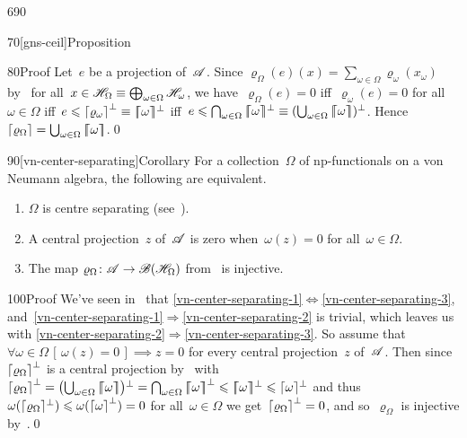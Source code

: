 \begin{parsec}{690}
\begin{point}{70}[gns-ceil]{Proposition}
\begin{point}{80}{Proof}
Let~$e$ be a projection of~$\mathscr{A}$.
Since
$\varrho_\Omega(e)(x)
= \sum_{\omega\in\Omega} \varrho_\omega(x_\omega)$
by~
for all~$x\in\mathscr{H}_\Omega\equiv\bigoplus_{\omega\in\Omega}\mathscr{H}_\omega$,
we have~$\varrho_\Omega(e)=0$
iff~$\varrho_\omega(e)=0$ for all~$\omega\in\Omega$
iff~$e\leqslant \smash{\left\lceil\varrho_\omega\right\rceil^\perp \equiv 
\smash{\left\lceil\!\!\left\lceil\omega\right\rceil\!\!\right\rceil}^\perp}$
iff~$e\leq \bigcap_{\omega\in\Omega}\smash{\cceil{\omega}}^\perp 
\equiv (\bigcup_{\omega\in\Omega} \cceil{\omega})^\perp$.
Hence~$\left\lceil\varrho_\Omega\right\rceil=\bigcup_{\omega\in\Omega}\left\lceil\!\!\left\lceil\omega\right\rceil\!\!\right\rceil$.\qed
\end{point}
\end{point}
\begin{point}{90}[vn-center-separating]{Corollary}%
For a collection~$\Omega$ of np-functionals
on a von Neumann algebra,
the following are equivalent.
\begin{enumerate}
\item
\label{vn-center-separating-1}
$\Omega$ is centre separating (see~).
\item
\label{vn-center-separating-2}
A central projection~$z$ of~$\mathscr{A}$ is zero
when~$\omega(z)=0$ for all~$\omega\in\Omega$.
\item
\label{vn-center-separating-3}
The map $\varrho_\Omega\colon\mathscr{A}\to\mathscr{B}(\mathscr{H}_\Omega)$
from~ 
is injective.
\end{enumerate}
\begin{point}{100}{Proof}%
We've seen in~
that
\ref{vn-center-separating-1}$\iff$\ref{vn-center-separating-3},
and~\ref{vn-center-separating-1}$\Rightarrow$\ref{vn-center-separating-2}
is trivial,
which leaves us with 
\ref{vn-center-separating-2}$\Rightarrow$\ref{vn-center-separating-3}.
So assume that~$\forall \omega\in\Omega\,[\,\omega(z)=0\,]\implies z=0$ 
for every central projection~$z$
of~$\mathscr{A}$.
Then since~$\left\lceil\varrho_\Omega\right\rceil^\perp$
is a central projection
by~
with
$\ceil{\varrho_\Omega}^\perp
=\smash{\bigl(\bigcup_{\omega\in\Omega} \smash{\cceil{\omega}\bigr)}}^\perp
=\bigcap_{\omega\in \Omega} \cceil{\omega}^\perp
\leq \smash{\cceil{\omega}}^\perp
\leq \smash{\ceil{\omega}}^\perp$
and thus
$\omega(\smash{\left\lceil\varrho_\Omega\right\rceil}^\perp)
\leqslant \omega(\left\lceil\omega\right\rceil^\perp)=0$
for all~$\omega\in\Omega$
we get~$\left\lceil\varrho_\Omega\right\rceil^\perp =0$,
and so~$\varrho_\Omega$ is injective
by~.\qed
\end{point}
\end{point}
\end{parsec}
